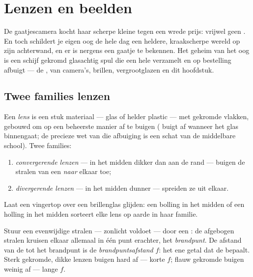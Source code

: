 \chapter{Lenzen en beelden}\label{ch:g8:lenses-images}

De gaatjescamera kocht haar scherpe kleine  tegen een wrede
prijs: vrijwel geen . En toch schildert je eigen oog de hele
dag een heldere, kraakscherpe wereld op zijn achterwand, en er is
nergens een gaatje te bekennen. Het geheim van het oog is een schijf
gekromd glasachtig spul die een hele  verzamelt en op
bestelling afbuigt --- de ,  van camera's,
brillen, vergrootglazen en dit hoofdstuk.

\section{Twee families lenzen}

\begin{definition}\label{def:g8:lenses-images:families}
Een \emph{lens} is een stuk  materiaal ---
glas of helder plastic --- met gekromde vlakken, gebouwd om
 op een beheerste manier af te buigen ( buigt
af wanneer het glas binnengaat; de precieze wet van die afbuiging is
een schat van de middelbare school). Twee families:
\begin{enumerate}
  \item \emph{convergerende lenzen} ---
        in het midden dikker dan aan de rand --- buigen de stralen
        van een  \emph{naar} elkaar toe;
  \item \emph{divergerende lenzen} --- in
        het midden dunner --- spreiden ze uit elkaar.
\end{enumerate}
Laat een vingertop over een brillenglas glijden: een bolling in het
midden of een holling in het midden sorteert elke lens op aarde in haar
familie.
\end{definition}

\begin{definition}\label{def:g8:lenses-images:focus}
Stuur een  evenwijdige stralen --- zonlicht voldoet --- door een
: de afgebogen stralen kruisen elkaar
allemaal in één punt erachter, het
\emph{brandpunt}. De afstand van de
 tot het brandpunt is de
\emph{brandpuntsafstand} $f$: het ene getal
dat de  bepaalt. Sterk gekromde, dikke lenzen buigen hard
af --- korte $f$; flauw gekromde buigen weinig af --- lange $f$.
\end{definition}

